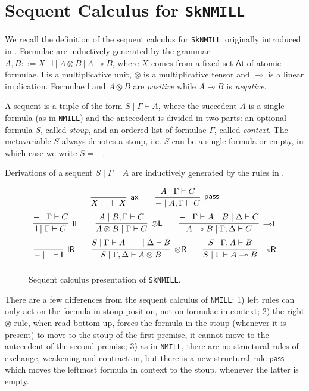 \documentclass[runningheads]{llncs}
\newcommand{\tl}{\otimes \mathsf{L}}
\newcommand{\tr}{\otimes \mathsf{R}}
\newcommand{\lright}{{\multimap}\mathsf{R}}
\newcommand{\lleft}{{\multimap}\mathsf{L}}
\newcommand{\pass}{\mathsf{pass}}
\newcommand{\unitl}{\mathsf{IL}}
\newcommand{\unitr}{\mathsf{IR}}
\newcommand{\lolliR}{\lright}
\newcommand{\ax}{\mathsf{ax}}
\newcommand{\ot}{\otimes}
\newcommand{\lolli}{\multimap}
\newcommand{\I}{\mathsf{I}}
\newcommand{\NMILL}{\texttt{NMILL}}
\newcommand{\SkNMILL}{\texttt{SkNMILL}}
\newcommand{\At}{\mathsf{At}}
\begin{document}
\section{Sequent Calculus for \SkNMILL}\label{sec:seqcalc}

We recall the definition of the sequent calculus for \SkNMILL\ originally introduced in \cite{UVW:protsn}.
Formulae are inductively generated by the grammar $A,B ::= X \ | \ \I \ | \ A \ot B \ | \ A \lolli B$, where $X$ comes from a fixed set $\At$ of atomic formulae, $\I$ is a multiplicative unit, $\ot$ is a multiplicative tensor and $\lolli$ is a linear implication. Formulae $\I$ and $A \ot B$ are \emph{positive} while $A \lolli B$ is \emph{negative}. 

A sequent is a triple of the form $S \mid \Gamma \vdash A$, where the succedent $A$ is a single formula (as in \NMILL) and the antecedent is divided in two parts: an optional formula $S$, called \emph{stoup}, and an ordered list of formulae $\Gamma$, called \emph{context}. 
The metavariable $S$ always denotes a stoup, i.e. $S$ can be a single formula or empty, in which case we write $S = -$.

Derivations of a sequent $S \mid \Gamma \vdash A$ are inductively generated by the rules in .
\begin{figure}[t]
  \[
  \def\arraystretch{2.5}
  \begin{array}{c}
    \infer[\ax]{X \mid \quad \vdash X}{}
    \qquad
    \infer[\pass]{- \mid A , \Gamma \vdash C}{A \mid \Gamma \vdash C}
    \\
    \infer[\unitl]{\I \mid \Gamma \vdash C}{- \mid \Gamma \vdash C}
    \qquad
    \infer[\tl]{A \ot B \mid \Gamma \vdash C}{A \mid B , \Gamma \vdash C}
    \qquad
    \infer[\lleft]{A \lolli B \mid \Gamma , \Delta \vdash C}{
      - \mid \Gamma \vdash A
      &
      B \mid \Delta \vdash C
    }
    \\
    \infer[\unitr]{- \mid \quad \vdash \I}{}
    \qquad
    \infer[\tr]{S \mid \Gamma , \Delta \vdash A \ot B}{
      S \mid \Gamma \vdash A
      &
      - \mid \Delta \vdash B
    }
    \qquad
    \infer[\lolliR]{S \mid \Gamma \vdash A \lolli B}{S \mid \Gamma , A \vdash B}
  \end{array}
  \]
\caption{Sequent calculus presentation of \SkNMILL.}
\label{fig:seqcalc}  
\end{figure}
There are a few differences from the sequent calculus of \NMILL:
1) left rules can only act on the formula in stoup position, not on formulae in context; 2) the right $\ot$-rule, when read bottom-up, forces the formula in the stoup (whenever it is present) to move to the stoup of the first premise, it cannot move to the antecedent of the second premise; 3) as in \NMILL, there are no structural rules of exchange, weakening and contraction, but there is a new structural rule $\pass$ which moves the leftmost formula in context to the stoup, whenever the latter is empty.
\end{document}

